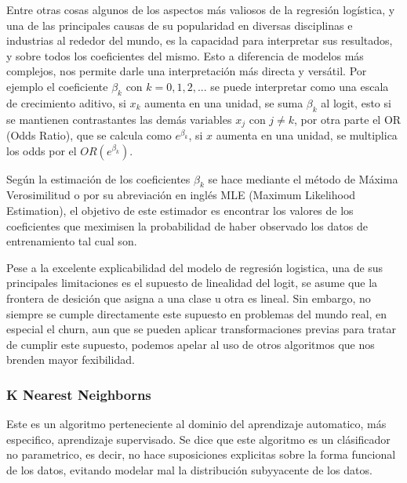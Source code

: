 Entre otras cosas algunos de los aspectos más valiosos de la regresión logística, y una de las principales causas de su popularidad en diversas disciplinas e industrias al rededor del mundo, es la capacidad para interpretar sus resultados, y sobre todos los coeficientes del mismo. Esto a diferencia de modelos más complejos, nos permite darle una interpretación más directa y versátil. Por ejemplo el coeficiente $\beta_k$ con $k=0, 1, 2,...$ se puede interpretar como una escala de crecimiento aditivo, si $x_k$ aumenta en una unidad, se suma $\beta_k$ al logit, esto si se mantienen contrastantes las demás variables $x_j$ con $j\neq k$, por otra parte el OR (Odds Ratio), que se calcula como $e^{\beta_k}$, si $x$ aumenta en una unidad, se multiplica los odds por el $OR(e^{ \beta_k })$.

Según \cite{james2013introduction} la estimación de los coeficientes $\beta_k$ se hace mediante el método de Máxima Verosimilitud o por su abreviación en inglés MLE (Maximum Likelihood Estimation), el objetivo de este estimador es encontrar los valores de los coeficientes que meximisen la probabilidad de haber observado los datos de entrenamiento tal cual son. 

Pese a la excelente explicabilidad del modelo de regresión logistica, una de sus principales limitaciones es el supuesto de linealidad del logit, se asume que la frontera de desición que asigna a una clase u otra es lineal. Sin embargo, no siempre se cumple directamente este supuesto en problemas del mundo real, en especial el churn, aun que se pueden aplicar transformaciones previas para tratar de cumplir este supuesto, podemos apelar al uso de otros algoritmos que nos brenden mayor fexibilidad.


\newpage

\subsubsection{K Nearest Neighborns}

Este es un algoritmo perteneciente al dominio del aprendizaje automatico, más especifico, aprendizaje supervisado. Se dice que este algoritmo es un clásificador no parametrico, es decir, no hace suposiciones explicitas sobre la forma funcional de los datos, evitando modelar mal la distribución subyyacente de los datos.

